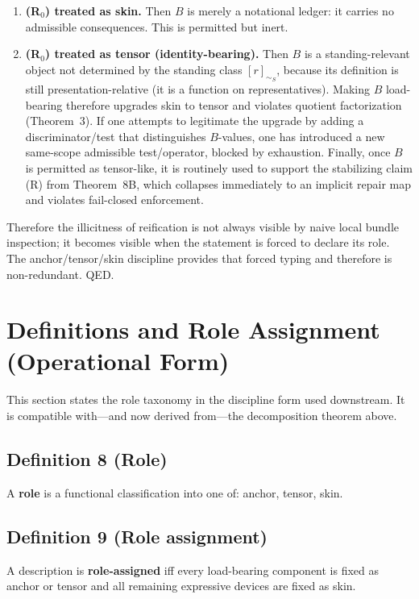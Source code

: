 \documentclass[12pt]{article}
\theoremstyle{plain}
\begin{document}
\begin{enumerate}[leftmargin=*]
\item \textbf{(R$_0$) treated as skin.} Then $B$ is merely a notational ledger: it carries no admissible consequences. This is permitted but inert.

\item \textbf{(R$_0$) treated as tensor (identity-bearing).} Then $B$ is a standing-relevant object not determined by the standing class $[r]_{\sim_S}$, because its definition is still presentation-relative (it is a function on representatives). Making $B$ load-bearing therefore upgrades skin to tensor and violates quotient factorization (Theorem~3). If one attempts to legitimate the upgrade by adding a discriminator/test that distinguishes $B$-values, one has introduced a new same-scope admissible test/operator, blocked by exhaustion. Finally, once $B$ is permitted as tensor-like, it is routinely used to support the stabilizing claim (R) from Theorem~8B, which collapses immediately to an implicit repair map and violates fail-closed enforcement.
\end{enumerate}

Therefore the illicitness of reification is not always visible by naive local bundle inspection; it becomes visible when the statement is forced to declare its role. The anchor/tensor/skin discipline provides that forced typing and therefore is non-redundant. QED.


\section{Definitions and Role Assignment (Operational Form)}

This section states the role taxonomy in the discipline form used downstream. It is compatible with---and now derived from---the decomposition theorem above.

\subsection{Definition 8 (Role)}

A \textbf{role} is a functional classification into one of: anchor, tensor, skin.

\subsection{Definition 9 (Role assignment)}

A description is \textbf{role-assigned} iff every load-bearing component is fixed as anchor or tensor and all remaining expressive devices are fixed as skin.
\end{document}

